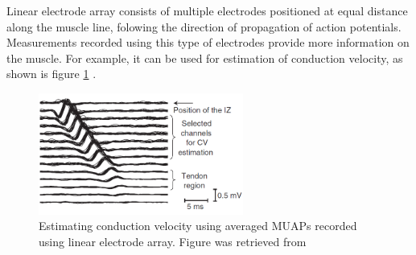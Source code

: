 Linear electrode array consists of multiple electrodes positioned at equal distance along the muscle line, folowing the direction of propagation of action potentials. Measurements recorded using this type of electrodes provide more information on the muscle. For example, it can be used for estimation of conduction velocity, as shown is figure \ref{fig:conduction_velocity} \citep{Merletti-book}.
\begin{figure}[ht]
\centering
\includegraphics[width=0.60\textwidth]{Images/introduction/conduction_velocity.png}
\caption{Estimating conduction velocity using averaged MUAPs recorded using linear electrode array. Figure was retrieved from \citep{Merletti-book}}
\label{fig:conduction_velocity}
\end{figure}

